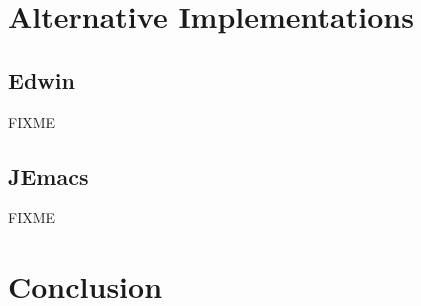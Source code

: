 \documentclass[format=acmsmall, review=false, screen=true]{acmart}
\begin{document}
\section{Alternative Implementations}

\subsection{Edwin}

FIXME \cite{Birkholz1993}

\subsection{JEmacs}

FIXME \cite{Bothner2001}

\section{Conclusion}




\end{document}
